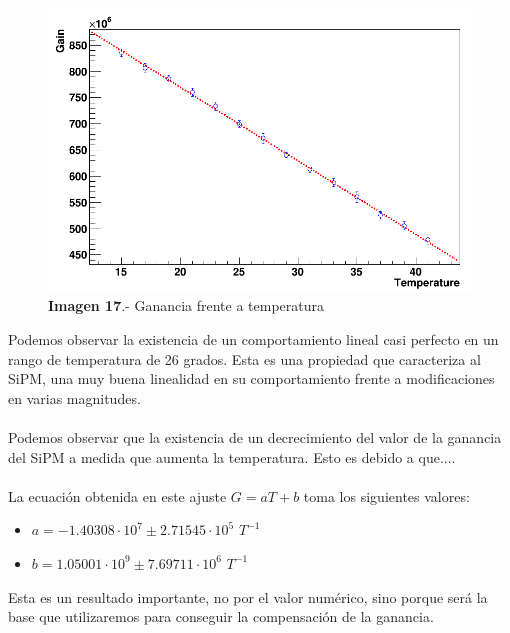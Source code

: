 \documentclass[11pt, a4paper]{article}
\begin{document}
\begin{itemize}
\begin{figure}[hbtp]
\centering
\includegraphics[scale=0.2]{Dependenciatemperatura.png}
\caption{\textbf{Imagen 17}.- Ganancia frente a temperatura}
\end{figure}

Podemos observar la existencia de un comportamiento lineal casi perfecto en un rango de temperatura de 26 grados. Esta es una propiedad que caracteriza al SiPM, una muy buena linealidad en su comportamiento frente a modificaciones en varias magnitudes.

\paragraph {}
Podemos observar que la existencia de un decrecimiento del valor de la ganancia del SiPM a medida que aumenta la temperatura. Esto es debido a que....

\paragraph {}
La ecuación obtenida en este ajuste $G=aT+b$ toma los siguientes valores: 
\begin{itemize}
\item{} $a=-1.40308 \cdot 10^7 \pm 2.71545 \cdot 10^5$ $T^{-1}$
\item{} $b=1.05001 \cdot 10^9 \pm 7.69711 \cdot 10^6$ $T^{-1}$
\end{itemize}

Esta es un resultado importante, no por el valor numérico, sino porque será la base que utilizaremos para conseguir la compensación de la ganancia.
\end{itemize}
\end{document}
